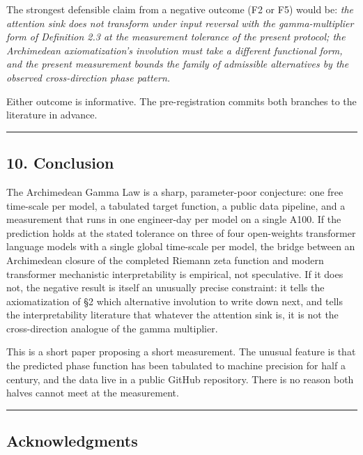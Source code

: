 \documentclass[
  letterpaper,
  11pt]{article}
\theoremstyle{plain}
\theoremstyle{definition}
\theoremstyle{remark}
\begin{document}
The strongest defensible claim from a negative outcome (F2 or F5) would be: \emph{the attention sink does not transform under input reversal with the gamma-multiplier form of Definition 2.3 at the measurement tolerance of the present protocol; the Archimedean axiomatization's involution must take a different functional form, and the present measurement bounds the family of admissible alternatives by the observed cross-direction phase pattern.}

Either outcome is informative. The pre-registration commits both branches to the literature in advance.

\begin{center}\rule{0.5\linewidth}{0.5pt}\end{center}

\subsection{10. Conclusion}\label{conclusion}

The Archimedean Gamma Law is a sharp, parameter-poor conjecture: one free time-scale per model, a tabulated target function, a public data pipeline, and a measurement that runs in one engineer-day per model on a single A100. If the prediction holds at the stated tolerance on three of four open-weights transformer language models with a single global time-scale per model, the bridge between an Archimedean closure of the completed Riemann zeta function and modern transformer mechanistic interpretability is empirical, not speculative. If it does not, the negative result is itself an unusually precise constraint: it tells the axiomatization of §2 which alternative involution to write down next, and tells the interpretability literature that whatever the attention sink is, it is not the cross-direction analogue of the gamma multiplier.

This is a short paper proposing a short measurement. The unusual feature is that the predicted phase function has been tabulated to machine precision for half a century, and the data live in a public GitHub repository. There is no reason both halves cannot meet at the measurement.

\begin{center}\rule{0.5\linewidth}{0.5pt}\end{center}

\subsection{Acknowledgments}\label{acknowledgments}
\end{document}
